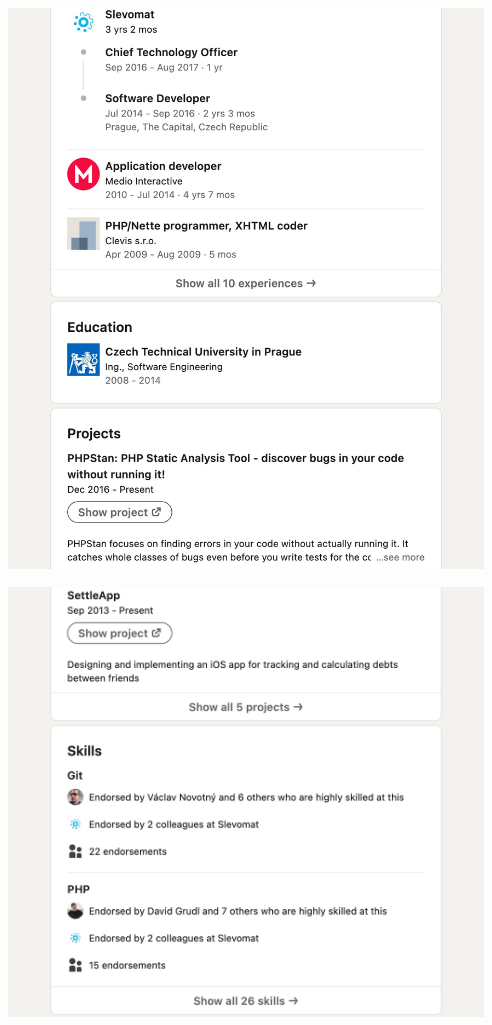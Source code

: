 \Continuing
\begin{center}
    \includegraphics[width=34em]{mirtes-linkedin-p2}
\end{center}
\WillContinue
\pagebreak

\Continuing
\begin{center}
    \includegraphics[width=34em]{mirtes-linkedin-p3}
\end{center}

\pagebreak
